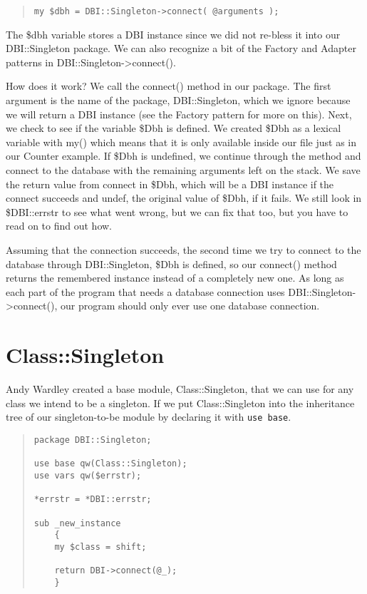 \begin{quote}    
\begin{verbatim}
my $dbh = DBI::Singleton->connect( @arguments );
\end{verbatim}
\end{quote}    

The \$dbh variable stores a DBI instance since we did not
re-bless it into our DBI::Singleton package.  We can also
recognize a bit of the Factory and Adapter patterns in
DBI::Singleton->connect().

How does it work?  We call the connect() method in our
package.  The first argument is the name of the package,
DBI::Singleton, which we ignore because we will return a DBI
instance (see the Factory pattern for more on this). Next,
we check to see if the variable \$Dbh is defined.  We
created \$Dbh as a lexical variable with my() which means
that it is only available inside our file just as in our
Counter example. If \$Dbh is undefined, we continue through
the method and connect to the database with the remaining
arguments left on the stack. We save the return value from
connect in \$Dbh, which will be a DBI instance if the
connect succeeds and undef, the original value of \$Dbh, if
it fails.  We still look in \$DBI::errstr to see what went
wrong, but we can fix that too, but you have to read on to
find out how.

Assuming that the connection succeeds, the second time we
try to connect to the database through DBI::Singleton, \$Dbh
is defined, so our connect() method returns the remembered
instance instead of a completely new one. As long as each
part of the program that needs a database connection uses
DBI::Singleton->connect(), our program should only ever use
one database connection.

    \section{Class::Singleton}

Andy Wardley created a base module, Class::Singleton, that
we can use for any class we intend to be a singleton.  If we
put Class::Singleton into the inheritance tree of our
singleton-to-be module by declaring it with {\tt use base}.

\begin{quote}    
\begin{verbatim}
package DBI::Singleton;

use base qw(Class::Singleton);
use vars qw($errstr);
    
*errstr = *DBI::errstr;

sub _new_instance
    {
    my $class = shift;
    
    return DBI->connect(@_);
    }
\end{verbatim}
\end{quote}    

